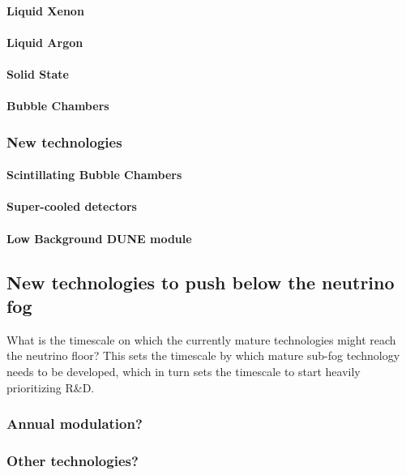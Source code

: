
\paragraph{Liquid Xenon}





\paragraph{Liquid Argon}




\paragraph{Solid State}



\paragraph{Bubble Chambers}


\subsubsection{New technologies}
\paragraph{Scintillating Bubble Chambers}

\paragraph{Super-cooled detectors}

\paragraph{Low Background DUNE module}




\subsection{New technologies to push below the neutrino fog}
What is the timescale on which the currently mature technologies might reach the neutrino floor? This sets the timescale by which mature sub-fog technology needs to be developed, which in turn sets the timescale to start heavily prioritizing R\&D. 




\subsubsection{Annual modulation?}
\subsubsection{Other technologies?}


